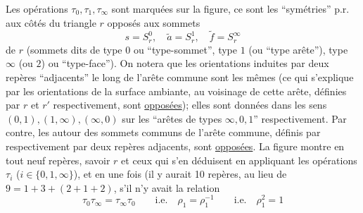 
Les opérations $\tau_0,\tau_1,\tau_\infty$ sont marquées sur la figure, ce sont les ``symétries'' p.r. aux côtés du triangle $r$ opposés aux sommets
\[
s=S_r^0,\quad\widetilde a=S_r^1,\quad\widetilde f=S_r^\infty
\]
de $r$ (sommets dits de type $0$ ou ``type-sommet'', type $1$ (ou ``type arête''), type $\infty$ (ou $2$) ou ``type-face''). On notera que les orientations induites par deux repères ``adjacents'' le long de l'arête commune sont les mêmes (ce qui s'explique par les  orientations de la surface ambiante, au voisinage de cette arête, définies par $r$ et $r'$ respectivement, sont \uline{opposées}); elles sont données dans les sens $(0,1),(1,\infty),(\infty,0)$ sur les ``arêtes de types $\infty,0,1$'' respectivement. Par contre, les   autour des sommets communs de l'arête commune, définis par  respectivement par deux repères adjacents, sont \uline{opposées}. La figure montre en tout neuf repères, savoir $r$ et ceux qui s'en déduisent en appliquant  les opérations $\tau_i$ ($i\in\{0,1,\infty\}$), et en   une fois
(il y aurait 10 repères, au lieu de $9=1+3+(2+1+2)$, s'il n'y avait  la relation
\[
\tau_0\tau_\infty=\tau_\infty\tau_0\qquad\text{i.e.}\quad\rho_1=\rho_1^{-1}\qquad\text{i.e.}\quad\rho_1^2=1
\]
